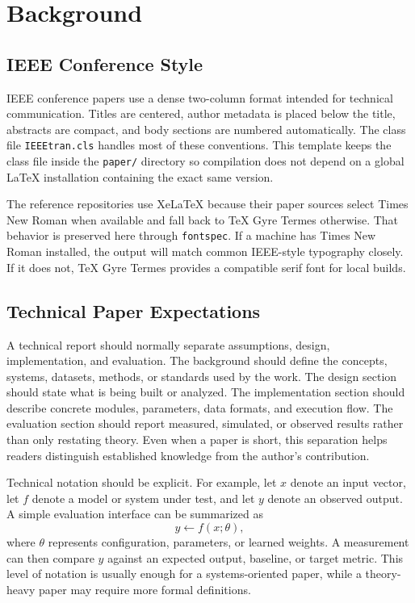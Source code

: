\section{Background}

\subsection{IEEE Conference Style}

IEEE conference papers use a dense two-column format intended for technical communication. Titles are centered, author metadata is placed below the title, abstracts are compact, and body sections are numbered automatically. The class file \texttt{IEEEtran.cls} handles most of these conventions. This template keeps the class file inside the \texttt{paper/} directory so compilation does not depend on a global LaTeX installation containing the exact same version.

The reference repositories use XeLaTeX because their paper sources select Times New Roman when available and fall back to TeX Gyre Termes otherwise. That behavior is preserved here through \texttt{fontspec}. If a machine has Times New Roman installed, the output will match common IEEE-style typography closely. If it does not, TeX Gyre Termes provides a compatible serif font for local builds.

\subsection{Technical Paper Expectations}

A technical report should normally separate assumptions, design, implementation, and evaluation. The background should define the concepts, systems, datasets, methods, or standards used by the work. The design section should state what is being built or analyzed. The implementation section should describe concrete modules, parameters, data formats, and execution flow. The evaluation section should report measured, simulated, or observed results rather than only restating theory. Even when a paper is short, this separation helps readers distinguish established knowledge from the author's contribution.

Technical notation should be explicit. For example, let $x$ denote an input vector, let $f$ denote a model or system under test, and let $y$ denote an observed output. A simple evaluation interface can be summarized as
\begin{equation}
  y \leftarrow f(x; \theta),
  \label{eq:model}
\end{equation}
where $\theta$ represents configuration, parameters, or learned weights. A measurement can then compare $y$ against an expected output, baseline, or target metric. This level of notation is usually enough for a systems-oriented paper, while a theory-heavy paper may require more formal definitions.

